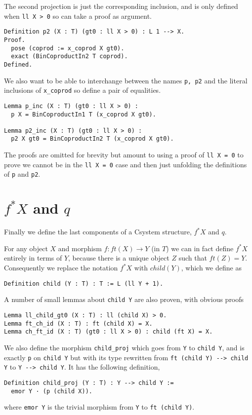 The second projection is just the corresponding inclusion, and is only defined
when \lstinline|ll X > 0| so can take a proof as argument.
\begin{lstlisting}
Definition p2 (X : T) (gt0 : ll X > 0) : L 1 --> X.
Proof.
  pose (coprod := x_coprod X gt0).
  exact (BinCoproductIn2 T coprod).
Defined.
\end{lstlisting}

We also want to be able to interchange between the names \lstinline|p, p2| and the
literal inclusions of \lstinline|x_coprod| so define a pair of equalities.
\begin{lstlisting}
Lemma p_inc (X : T) (gt0 : ll X > 0) :
  p X = BinCoproductIn1 T (x_coprod X gt0).

Lemma p2_inc (X : T) (gt0 : ll X > 0) : 
  p2 X gt0 = BinCoproductIn2 T (x_coprod X gt0).
\end{lstlisting}
The proofs are omitted for brevity but amount to using a proof of 
\lstinline|ll X = 0| to prove we cannot be in the \lstinline|ll X = 0| case and 
then just unfolding the definitions of \lstinline|p| and \lstinline|p2|.

\section{$f^*X$ and $q$}
Finally we define the last components of a Csystem structure, $f^*X$ and $q$.

For any object $X$ and morphism $f : ft(X)\to Y$ (in $T$) we can in fact define
$f^*X$ entirely in terms of $Y$, because there is a unique object $Z$ such that
$ft(Z) = Y$. Consequently we replace the notation $f^*X$ with $child(Y)$, which
we define as
\begin{lstlisting}
Definition child (Y : T) : T := L (ll Y + 1).
\end{lstlisting}

A number of small lemmas about \lstinline|child Y| are also proven, with obvious
proofs
\begin{lstlisting}
Lemma ll_child_gt0 (X : T) : ll (child X) > 0.
Lemma ft_ch_id (X : T) : ft (child X) = X.
Lemma ch_ft_id (X : T) (gt0 : ll X > 0) : child (ft X) = X.
\end{lstlisting}

We also define the morphism \lstinline|child_proj| which goes from \lstinline|Y|
to \lstinline|child Y|, and is exactly \lstinline|p| on \lstinline|child Y| but
with its type rewritten from \lstinline|ft (child Y) --> child Y| to
\lstinline|Y --> child Y|. It has the following definition,
\begin{lstlisting}
Definition child_proj (Y : T) : Y --> child Y := 
  emor Y · (p (child X)).
\end{lstlisting}
where \lstinline|emor Y| is the trivial morphism from \lstinline|Y| to 
\lstinline|ft (child Y)|.

